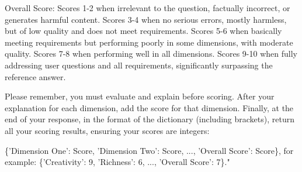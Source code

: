 Overall Score:
Scores 1-2 when irrelevant to the question, factually incorrect, or generates harmful content.
Scores 3-4 when no serious errors, mostly harmless, but of low quality and does not meet requirements.
Scores 5-6 when basically meeting requirements but performing poorly in some dimensions, with moderate quality.
Scores 7-8 when performing well in all dimensions.
Scores 9-10 when fully addressing user questions and all requirements, significantly surpassing the reference answer.

Please remember, you must evaluate and explain before scoring. After your explanation for each dimension, add the score for that dimension. Finally, at the end of your response, in the format of the dictionary (including brackets), return all your scoring results, ensuring your scores are integers:

\{'Dimension One': Score, 'Dimension Two': Score, ..., 'Overall Score': Score\}, for example: \{'Creativity': 9, 'Richness': 6, ..., 'Overall Score': 7\}."
